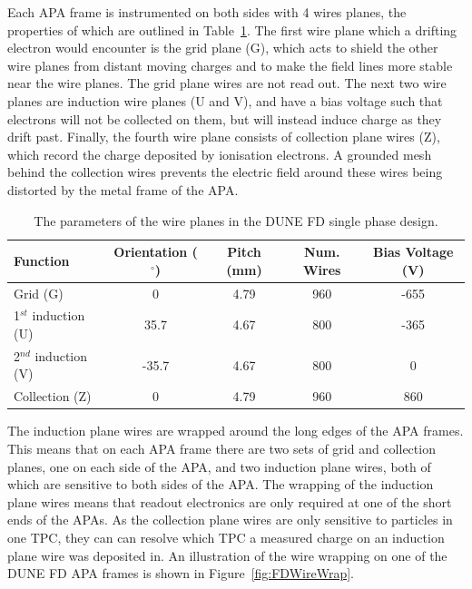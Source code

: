 Each APA frame is instrumented on both sides with 4 wires planes, the properties of which are outlined in Table~\ref{tab:DUNE_SP_WP}. The first wire plane which a drifting electron would encounter is the grid plane (G), which acts to shield the other wire planes from distant moving charges and to make the field lines more stable near the wire planes. The grid plane wires are not read out. The next two wire planes are induction wire planes (U and V), and have a bias voltage such that electrons will not be collected on them, but will instead induce charge as they drift past. Finally, the fourth wire plane consists of collection plane wires (Z), which record the charge deposited by ionisation electrons. A grounded mesh behind the collection wires prevents the electric field around these wires being distorted by the metal frame of the APA. \\

\begin{table}
  \caption[The parameters of the wire planes in the DUNE FD single phase design]
          {The parameters of the wire planes in the DUNE FD single phase design.}
  \label{tab:DUNE_SP_WP}
  \centering
  \begin{tabular}{l c c c c}
    \toprule
    {Function}             & {Orientation ($^{\circ}$)} & {Pitch (mm)} & Num. Wires & Bias Voltage (V) \\ 
    \midrule
    Grid (G)               & 0                          & 4.79         & 960        & -655 \\
    
    1$^{st}$ induction (U) & 35.7                       & 4.67         & 800        & -365 \\
    
    2$^{nd}$ induction (V) & -35.7                      & 4.67         & 800        & 0    \\
    
    Collection (Z)         & 0                          & 4.79         & 960        & 860 \\
    \bottomrule
  \end{tabular}
\end{table}

The induction plane wires are wrapped around the long edges of the APA frames. This means that on each APA frame there are two sets of grid and collection planes, one on each side of the APA, and two induction plane wires, both of which are sensitive to both sides of the APA. The wrapping of the induction plane wires means that readout electronics are only required at one of the short ends of the APAs. As the collection plane wires are only sensitive to particles in one TPC, they can can resolve which TPC a measured charge on an induction plane wire was deposited in. An illustration of the wire wrapping on one of the DUNE FD APA frames is shown in Figure~\ref{fig:FDWireWrap}. \\

